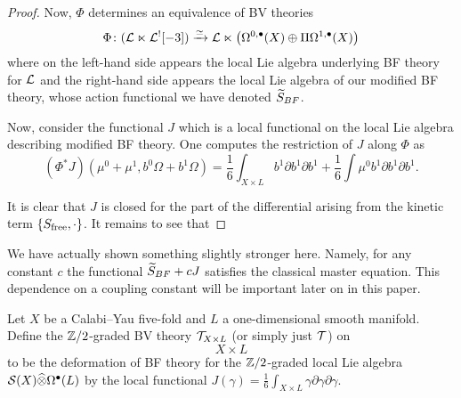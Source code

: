 \documentclass[11pt]{amsart}
\begin{document}
\begin{proof}
Now, $\Phi$ determines an equivalence of BV theories 
\[
\Phi \colon (\cL \ltimes \cL^! [-3]) \xto{\simeq} \cL \ltimes \left(\Omega^{0,\bu}(X) \oplus \Pi \Omega^{1,\bu}(X)\right)
\]
where on the left-hand side appears the local Lie algebra underlying BF theory for $\cL$ and the right-hand side appears the local Lie algebra of our modified BF theory, whose action functional we have denoted $\Tilde{S}_{BF}$. 

Now, consider the functional $J$ which is a local functional on the local Lie algebra describing modified BF theory. 
One computes the restriction of $J$ along $\Phi$ as
\[
(\Phi^* J) (\mu^0 + \mu^1 , b^0 \Omega + b^1 \Omega) = \frac16 \int_{X \times L} b^1 \partial b^1 \partial b^1 + \frac16 \int \mu^0 b^1 \partial b^1 \partial b^1 .
\]


It is clear that $J$ is closed for the part of the differential arising from the kinetic term $\{S_{\rm free},\cdot\}$.
It remains to see that
\end{proof}

\begin{rmk}
  We have actually shown something slightly stronger here.
  Namely, for any constant $c$ the functional $\Tilde{S}_{BF} + c J$ satisfies the classical master equation.
  This dependence on a coupling constant will be important later on in this paper.
\end{rmk}

\begin{dfn}\label{dfn:11dtheory}
Let $X$ be a Calabi--Yau five-fold and $L$ a one-dimensional smooth manifold.
Define the $\ZZ/2$-graded BV theory $\cT_{X \times L}$ (or simply just $\cT$) on
\[
  X \times L
\]
to be the deformation of BF theory for the $\ZZ/2$-graded local Lie algebra $\cS(X) \Hat{\otimes} \Omega^{\bu}(L)$ by the local functional $J (\gamma) = \frac16 \int_{X \times L} \gamma \partial \gamma \partial \gamma.$
\end{dfn}

\end{document}
